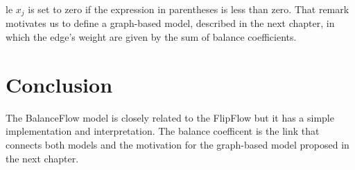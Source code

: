 le $x_j$ is set to zero if the expression in parentheses is less than zero. That remark motivates us to define a graph-based model, described in the next chapter, in which the edge's weight are given by the sum of balance coefficients.


\section{Conclusion}
The BalanceFlow model is closely related to the FlipFlow but it has a simple implementation and interpretation. The balance coefficent is the link that connects both models and the motivation for the graph-based model proposed in the next chapter.




